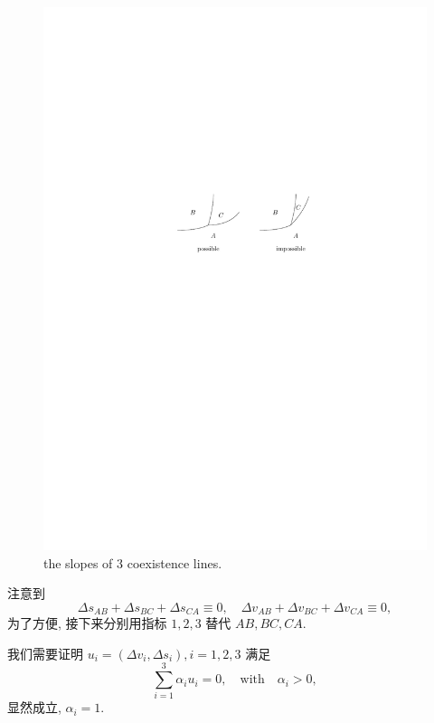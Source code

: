 \begin{itemize}
	\begin{figure}[H]
		\centering
		\includegraphics[scale=1]{figures/the slopes of 3 coexistence lines.pdf}
		\caption{the slopes of 3 coexistence lines.}
	\end{figure}
	
	\begin{tcolorbox}[title=proof:]
		注意到
		\begin{equation}
			\Delta s_{AB} + \Delta s_{BC} + \Delta s_{CA} \equiv 0, \quad \Delta v_{AB} + \Delta v_{BC} + \Delta v_{CA} \equiv 0,
		\end{equation}
		为了方便, 接下来分别用指标 $1, 2, 3$ 替代 $AB, BC, CA$.
		
		我们需要证明 $u_i = (\Delta v_i, \Delta s_i), i = 1, 2, 3$ 满足
		\begin{equation}
			\sum_{i = 1}^3 \alpha_i u_i = 0, \quad \text{with} \quad \alpha_i > 0,
		\end{equation}
		显然成立, $\alpha_i = 1$.
	\end{tcolorbox}
\end{itemize}
